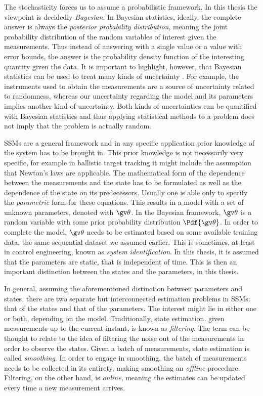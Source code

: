 The stochasticity forces us to assume a probabilistic framework. In this thesis the viewpoint
is decidedly \emph{Bayesian}. In Bayesian statistics, ideally, the complete answer
is always the \emph{posterior probability distribution}, meaning the joint probability distribution
of the random variables of interest given the measurements. Thus instead of answering
with a single value or a value with error bounds, the answer is the probability
density function of the interesting quantity given the data. It is important to highlight,
however, that Bayesian statistics can be used to treat many kinds of uncertainty
\parencite[as pointed out in e.g.][]{Sarkka2012a}. For example, the instruments used 
to obtain the measurements are a source of uncertainty related to randomness, 
whereas our uncertainty regarding the model and its parameters implies
another kind of uncertainty. Both kinds of uncertainties can be quantified with Bayesian
statistics and thus applying statistical methods to a problem does not imply that the problem 
is actually random.

SSMs are a general framework and in any specific application prior knowledge of the
system has to be brought in. This prior knowledge is not necessarily very specific,
for example in ballistic target tracking it might include the assumption that Newton's
laws are applicable. The mathematical form of the dependence
between the measurements and the state has to be formulated as well as the dependence
of the state on its predecessors. Usually one is able only to specify the 
\emph{parametric} form for these equations. This results in a model with a set
of unknown parameters, denoted with $\Th$. In the Bayesian framework, $\Th$ is
a random variable with some prior probability distribution $\Pdf{\Th}$.
In order to complete the model, $\Th$ needs to be estimated based on some available
training data, the same sequential dataset we assumed earlier. This is sometimes, at least
in control engineering, known as \emph{system identification}. In this thesis,
it is assumed that the parameters are static, that is independent of time. 
This is then an important distinction between the states and
the parameters, in this thesis.

In general, assuming the aforementioned distinction between parameters and states, there are two separate but
interconnected estimation problems in SSMs: that of the states and that of the parameters. 
The interest might lie in either one or both, depending on the model. Traditionally, state
estimation, given measurements up to the current instant, is known as \emph{filtering}.
The term can be thought to relate to the idea of filtering the noise out of the measurements
in order to observe the states. Given a batch of measurements, state estimation is called \emph{smoothing}.
In order to engage in smoothing, the batch of measurements needs to be collected in its entirety, 
making smoothing an \emph{offline} procedure. Filtering, on the other hand, is \emph{online}, 
meaning the estimates can be updated every time a new measurement arrives.

